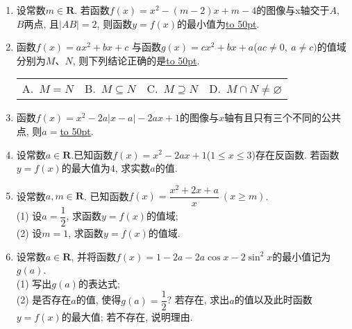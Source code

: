 \documentclass[10pt,a4paper]{article}
\newcommand{\blank}[1]{\underline{\hbox to #1pt{}}}
\newcommand{\fourch}[4]{\par\begin{tabular}{p{.23\textwidth}p{.23\textwidth}p{.23\textwidth}p{.23\textwidth}}
A.~#1 &B.~#2& C.~#3& D.~#4
\end{tabular}}
\begin{document}
\begin{enumerate}[1.]
\item 设常数$m\in \mathbf{R}$. 若函数$f(x)=x^2-(m-2)x+m-4$的图像与x轴交于$A$, $B$两点, 且$|AB|=2$, 则函数$y=f(x)$的最小值为\blank{50}.
\item 函数$f(x)=ax^2+bx+c$ 与函数$g(x)=cx^2+bx+a$($ac\ne 0,\ a\ne c)$的值域分别为$M$、$N$, 则下列结论正确的是\blank{50}.
\fourch{$M=N$}{$M\subseteq N$}{$M\supseteq N$}{$M\cap N\ne \varnothing$}
\item 函数$f(x)=x^2-2a|x-a|-2ax+1$的图像与$x$轴有且只有三个不同的公共点, 则$a=$\blank{50}.
\item 设常数$a\in \mathbf{R}$.已知函数$f(x)=x^2-2ax+1$($1\le x\le 3$)存在反函数. 若函数$y=f(x)$的最大值为$4$, 求实数$a$的值.
\item 设常数$a,m\in \mathbf{R}$. 已知函数$f(x)=\dfrac{x^2+2x+a}x\  (x\ge m)$.\\
(1) 设$a=\dfrac 12$, 求函数$y=f(x)$的值域;\\
(2) 设$m=1$, 求函数$y=f(x)$的值域.
\item 设常数$a\in \mathbf{R}$, 并将函数$f(x)=1-2a-2a\cos x-2\sin^2 x$的最小值记为$g(a)$.\\
(1) 写出$g(a)$的表达式;\\
(2) 是否存在$a$的值, 使得$g(a)=\dfrac 12$? 若存在, 求出$a$的值以及此时函数$y=f(x)$的最大值; 若不存在, 说明理由.


\end{enumerate}
\end{document}
